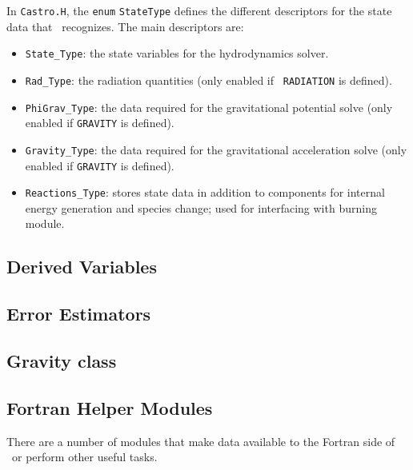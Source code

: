 In {\tt Castro.H}, the {\tt enum} {\tt StateType} defines the
different descriptors for the state data that \castro\ recognizes.
The main descriptors are:
\begin{itemize}
\item {\tt State\_Type}: the state variables for the hydrodynamics solver.

\item {\tt Rad\_Type}: the radiation quantities (only enabled if {\tt
  RADIATION} is defined).

\item {\tt PhiGrav\_Type}: the data required for the gravitational potential solve (only
  enabled if {\tt GRAVITY} is defined).

\item {\tt Gravity\_Type}: the data required for the gravitational acceleration solve (only
  enabled if {\tt GRAVITY} is defined).

\item {\tt Reactions\_Type}: stores state data in addition to components
  for internal energy generation and species change; used for interfacing
  with burning module.
\end{itemize}




\subsection{Derived Variables}

\subsection{Error Estimators}


\subsection{Gravity class}


\subsection{Fortran Helper Modules}

There are a number of modules that make data available to the Fortran
side of \castro\ or perform other useful tasks.

